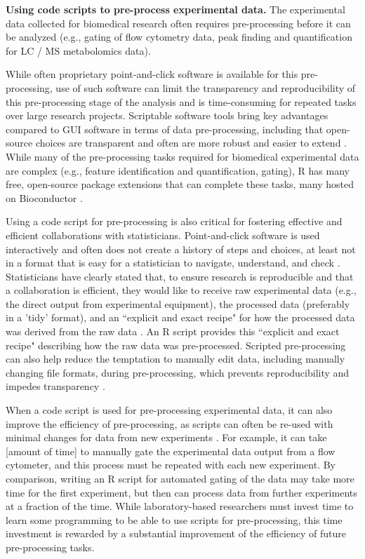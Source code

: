 \documentclass[pdftex,english,11pt,parskip=half]{scrartcl}
\begin{document}
\textbf{Using code scripts to pre-process experimental data.} The experimental data collected for biomedical research often requires 
pre-processing before it can be analyzed (e.g., gating of flow cytometry data, 
peak finding and quantification for LC / MS metabolomics data). 

While 
often proprietary point-and-click software is available for this pre-processing,
use of such software can limit the transparency and reproducibility of this 
pre-processing stage of the analysis and is 
time-consuming for repeated tasks over large research projects. Scriptable
software tools bring key advantages compared to GUI software in terms of data
pre-processing, including that open-source choices are transparent and often are more robust and easier to extend \cite{cetinkaya2017infrastructure, huber2015orchestrating,
preeyanon2014reproducible, piccolo2016tools, baumer2017lessons}. While many of the pre-processing tasks required for biomedical experimental data are complex (e.g., feature identification and quantification, gating), R has many free, open-source package extensions that can complete these tasks, many hosted on Bioconductor \cite{huber2015orchestrating}.

Using a code script for pre-processing is also critical for fostering effective and efficient collaborations with statisticians. Point-and-click software is used interactively and often does not create a history of steps and choices, at least not in a format that is easy for a statistician to navigate, understand, and check \cite{peng2011reproducible, pernet2015improving}. Statisticians have clearly stated that, to ensure research is reproducible and that a collaboration is efficient, they would like to receive raw experimental data (e.g., the direct output from experimental equipment), the processed data (preferably in a 'tidy' format), and an ``explicit and exact recipe" for how the processed data was derived from the raw data \cite{ellis2018share}. An R script provides this ``explicit and exact recipe" describing how the raw data was pre-processed. Scripted pre-processing can also help reduce the temptation to manually edit data, including manually changing file formats, during pre-processing, which prevents reproducibility and impedes transparency \cite{pernet2015improving}.

When a code script is used for pre-processing experimental data, it can also improve the efficiency of pre-processing, as scripts can often be re-used with minimal changes for data from new experiments \cite{pernet2015improving}. For example, it can take [amount of time] to manually gate the experimental data output from a flow cytometer, and this process must be repeated with each new experiment. By comparison, writing an R script for automated gating of the data may take more time for the first experiment, but then can process data from further experiments at a fraction of the time. While laboratory-based researchers must invest time to learn some programming to be able to use scripts for pre-processing, this time investment is rewarded by a substantial improvement of the efficiency of future pre-processing tasks. 
\end{document}
